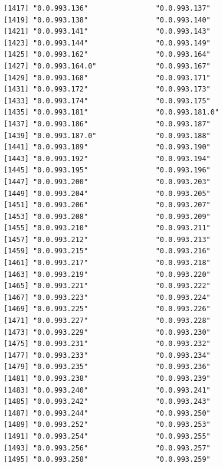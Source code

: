 \documentclass[
  letterpaper,
  DIV=11,
  numbers=noendperiod]{scrreprt}
\begin{document}
\begin{verbatim}
[1417] "0.0.993.136"                "0.0.993.137"               
[1419] "0.0.993.138"                "0.0.993.140"               
[1421] "0.0.993.141"                "0.0.993.143"               
[1423] "0.0.993.144"                "0.0.993.149"               
[1425] "0.0.993.162"                "0.0.993.164"               
[1427] "0.0.993.164.0"              "0.0.993.167"               
[1429] "0.0.993.168"                "0.0.993.171"               
[1431] "0.0.993.172"                "0.0.993.173"               
[1433] "0.0.993.174"                "0.0.993.175"               
[1435] "0.0.993.181"                "0.0.993.181.0"             
[1437] "0.0.993.186"                "0.0.993.187"               
[1439] "0.0.993.187.0"              "0.0.993.188"               
[1441] "0.0.993.189"                "0.0.993.190"               
[1443] "0.0.993.192"                "0.0.993.194"               
[1445] "0.0.993.195"                "0.0.993.196"               
[1447] "0.0.993.200"                "0.0.993.203"               
[1449] "0.0.993.204"                "0.0.993.205"               
[1451] "0.0.993.206"                "0.0.993.207"               
[1453] "0.0.993.208"                "0.0.993.209"               
[1455] "0.0.993.210"                "0.0.993.211"               
[1457] "0.0.993.212"                "0.0.993.213"               
[1459] "0.0.993.215"                "0.0.993.216"               
[1461] "0.0.993.217"                "0.0.993.218"               
[1463] "0.0.993.219"                "0.0.993.220"               
[1465] "0.0.993.221"                "0.0.993.222"               
[1467] "0.0.993.223"                "0.0.993.224"               
[1469] "0.0.993.225"                "0.0.993.226"               
[1471] "0.0.993.227"                "0.0.993.228"               
[1473] "0.0.993.229"                "0.0.993.230"               
[1475] "0.0.993.231"                "0.0.993.232"               
[1477] "0.0.993.233"                "0.0.993.234"               
[1479] "0.0.993.235"                "0.0.993.236"               
[1481] "0.0.993.238"                "0.0.993.239"               
[1483] "0.0.993.240"                "0.0.993.241"               
[1485] "0.0.993.242"                "0.0.993.243"               
[1487] "0.0.993.244"                "0.0.993.250"               
[1489] "0.0.993.252"                "0.0.993.253"               
[1491] "0.0.993.254"                "0.0.993.255"               
[1493] "0.0.993.256"                "0.0.993.257"               
[1495] "0.0.993.258"                "0.0.993.259"               

\end{verbatim}
\end{document}
